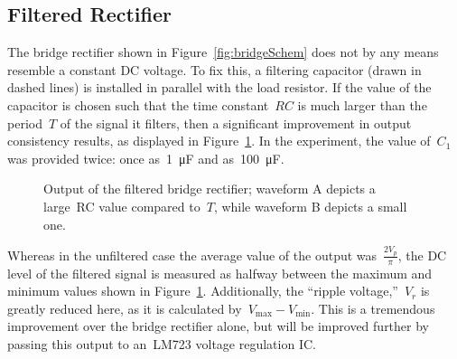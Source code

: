 \subsection{Filtered Rectifier}
The bridge rectifier shown in Figure~\ref{fig:bridgeSchem} does not by any
means resemble a constant DC voltage.  To fix this, a filtering capacitor
(drawn in dashed lines) is installed in parallel with the load resistor.  If
the value of the capacitor is chosen such that the time constant~$RC$ is much
larger than the period~$T$ of the signal it filters, then a significant
improvement in output consistency results, as displayed in
Figure~\ref{fig:bridgeRectOutFilt}.  In the experiment, the value of~$C_1$ was
provided twice: once as~\SI{1}{\micro\farad} and as~\SI{100}{\micro\farad}.
%
\begin{figure}[H]
	\centering
	
	\parbox{.6\textwidth}{
	\caption[Plot --- Filtered Bridge Rectifier Output]{Output of the filtered
	bridge rectifier; waveform A depicts a large~RC value compared to~$T$,
	while waveform B depicts a small one.}
	\label{fig:bridgeRectOutFilt}
	}
\end{figure}
%
Whereas in the unfiltered case the average value of the output was~$\frac{2
V_p}{\pi}$, the DC level of the filtered signal is measured as halfway between
the maximum and minimum values shown in Figure~\ref{fig:bridgeRectOutFilt}.
Additionally, the ``ripple voltage,''~$V_r$ is greatly reduced here, as it is
calculated by~$V_\text{max} - V_\text{min}$.  This is a tremendous improvement
over the bridge rectifier alone, but will be improved further by passing this
output to an~LM723 voltage regulation IC.

